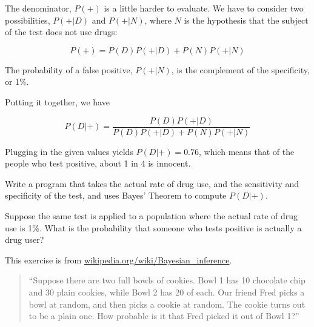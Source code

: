 \documentclass[10pt]{book}
\begin{document}
The denominator, $P(+)$ is a little harder to evaluate.  We have to
consider two possibilities, $P(+|D)$ and $P(+|N)$, where $N$ is the
hypothesis that the subject of the test does not use drugs:

\[ P(+) = P(D) P(+|D) + P(N) P(+|N) \]

The probability of a false positive, $P(+|N)$, is the complement
of the specificity, or 1\%.

Putting it together, we have

\[ P(D|+) = \frac{P(D) P(+|D)}{P(D) P(+|D) + P(N) P(+|N)}\]

Plugging in the given values yields $P(D|+) = 0.76$, which means
that of the people who test positive, about 1 in 4 is innocent. 

\begin{ex}

Write a program that takes the actual rate of drug use, and the
sensitivity and specificity of the test, and uses Bayes' Theorem
to compute $P(D|+)$.

Suppose the same test is applied to a population where the actual
rate of drug use is 1\%.  What is the probability that someone
who tests positive is actually a drug user?

\end{ex}


\begin{ex}

This exercise is from \url{wikipedia.org/wiki/Bayesian_inference}.

\begin{quote}

``Suppose there are two full bowls of cookies. Bowl 1 has 10 chocolate
  chip and 30 plain cookies, while Bowl 2 has 20 of each. Our friend
  Fred picks a bowl at random, and then picks a cookie at random. The
  cookie turns out to be a plain one. How probable is it that Fred
  picked it out of Bowl 1?''

\end{quote}

\end{ex}





\end{document}
